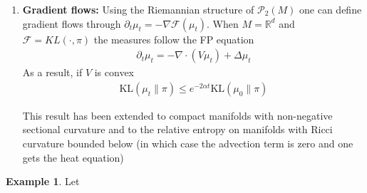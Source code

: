 \documentclass[
    a4paper,
    DIV=14,
    abstract=true,
    numbers=noenddot
]
{scrartcl}
\theoremstyle{definition}
\newtheorem{example}[theorem]{Example}
\newcommand{\Th}{{\bm{\theta}}}
\newcommand{\R}{\mathbb{R}}
\newcommand{\Ff}{\mathcal{F}}
\newcommand{\Pp}{\mathcal{P}}
\newcommand{\Tt}{\mathcal{T}}
\begin{document}
\begin{enumerate}
\emph{Trasnformers}: The output does not depend on permutation on tokens as a result, one can view collection of tokens as probability measure $\mu $.  Deep transformers can be modeled in the infinite depth limit as flows $\mu _t$, given parameters $\Th =(Q_t,K_t,V_t)$  
\begin{align*}
    x'_i(t)= \Gamma _{\Th }[\mu _t](x_i(t)), \quad \mu_t = \frac{1}{n} \sum_{i=1}^n \delta_{x_i(t)} 
\end{align*}
and thus 
\begin{align*}
    \partial_t \mu _t = -\nabla \cdot \qty(\mu_t \Gamma _{\Theta }[\mu _t])
\end{align*}
The resulting dynamics can be related to Vlasov equations but not WGs without a change in the metric \cite{peyre2025optimal}. There are universality results that say that given any function $\Tt$  on $(\alpha_0,x)$ I can find a transformer that evolves as above and approximates  A better understanding of the training dynamics (evolution of $\Th $) is also required.


 

\item \textbf{Gradient flows:} Using the Riemannian structure of $\Pp _2(M)$ one can define gradient flows through $\partial _t \mu _t = - \nabla \Ff (\mu _t)$. When $M= \R^d$ and $\Ff = KL(\cdot , \pi )$ the measures follow the FP equation 
\begin{align*}
    \partial _t \mu _t = - \nabla\cdot(V  \mu_t) + \Delta \mu _t
\end{align*}
As a result, if $V$ is convex 
\begin{align*}
    \mathrm{KL}\left(\mu_t \| \pi\right) \leq e^{-2 \alpha t} \mathrm{KL}\left(\mu_0 \| \pi\right)
\end{align*}
 

This result has been extended to compact manifolds with non-negative sectional curvature \cite{ohta2009gradient} and to the relative entropy on manifolds with Ricci curvature bounded below (in which case the advection term is zero and one gets the heat equation)
\end{enumerate}

\begin{example}
Let 
\end{example}
\end{document}
